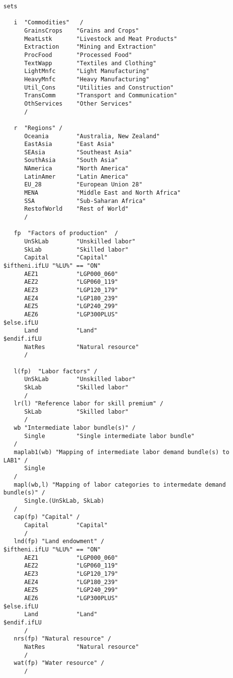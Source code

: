 \begin{lstlisting}[language=GAMS, caption={Standard mappings}, label=lst:StdMap]
sets

   i  "Commodities"   /
      GrainsCrops    "Grains and Crops"
      MeatLstk       "Livestock and Meat Products"
      Extraction     "Mining and Extraction"
      ProcFood       "Processed Food"
      TextWapp       "Textiles and Clothing"
      LightMnfc      "Light Manufacturing"
      HeavyMnfc      "Heavy Manufacturing"
      Util_Cons      "Utilities and Construction"
      TransComm      "Transport and Communication"
      OthServices    "Other Services"
      /

   r  "Regions" /
      Oceania        "Australia, New Zealand"
      EastAsia       "East Asia"
      SEAsia         "Southeast Asia"
      SouthAsia      "South Asia"
      NAmerica       "North America"
      LatinAmer      "Latin America"
      EU_28          "European Union 28"
      MENA           "Middle East and North Africa"
      SSA            "Sub-Saharan Africa"
      RestofWorld    "Rest of World"
      /

   fp  "Factors of production"  /
      UnSkLab        "Unskilled labor"
      SkLab          "Skilled labor"
      Capital        "Capital"
$iftheni.ifLU "%LU%" == "ON"
      AEZ1           "LGP000_060"
      AEZ2           "LGP060_119"
      AEZ3           "LGP120_179"
      AEZ4           "LGP180_239"
      AEZ5           "LGP240_299"
      AEZ6           "LGP300PLUS"
$else.ifLU
      Land           "Land"
$endif.ifLU
      NatRes         "Natural resource"
      /

   l(fp)  "Labor factors" /
      UnSkLab        "Unskilled labor"
      SkLab          "Skilled labor"
      /
   lr(l) "Reference labor for skill premium" /
      SkLab          "Skilled labor"
      /
   wb "Intermediate labor bundle(s)" /
      Single         "Single intermediate labor bundle"
   /
   maplab1(wb) "Mapping of intermediate labor demand bundle(s) to LAB1" /
      Single
   /
   mapl(wb,l) "Mapping of labor categories to intermedate demand bundle(s)" /
      Single.(UnSkLab, SkLab)
   /
   cap(fp) "Capital" /
      Capital        "Capital"
      /
   lnd(fp) "Land endowment" /
$iftheni.ifLU "%LU%" == "ON"
      AEZ1           "LGP000_060"
      AEZ2           "LGP060_119"
      AEZ3           "LGP120_179"
      AEZ4           "LGP180_239"
      AEZ5           "LGP240_299"
      AEZ6           "LGP300PLUS"
$else.ifLU
      Land           "Land"
$endif.ifLU
      /
   nrs(fp) "Natural resource" /
      NatRes         "Natural resource"
      /
   wat(fp) "Water resource" /
      /


\end{lstlisting}
